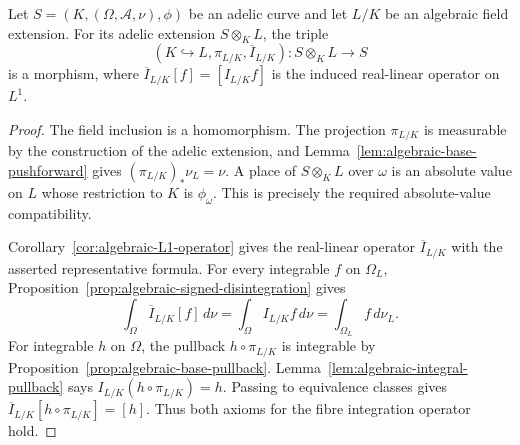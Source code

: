 \begin{example}
\label{ex:algebraic-extension-morphism}
\leanok
{}
Let $S=(K,(\Omega,\mathcal A,\nu),\phi)$ be an adelic curve and
let $L/K$ be an algebraic field extension. For its adelic extension
$S\otimes_K L$, the triple
\[
 (K\hookrightarrow L,\pi_{L/K},\overline I_{L/K})
 :S\otimes_K L\longrightarrow S
\]
is a morphism, where
$\overline I_{L/K}[f]=[I_{L/K}f]$ is the induced real-linear
operator on $L^1$.
\end{example}
\begin{proof}
The field inclusion is a homomorphism. The projection $\pi_{L/K}$
is measurable by the construction of the adelic extension, and
Lemma~\ref{lem:algebraic-base-pushforward} gives
$(\pi_{L/K})_*\nu_L=\nu$. A place of $S\otimes_K L$ over
$\omega$ is an absolute value on $L$ whose restriction to $K$ is
$\phi_\omega$. This is precisely the required absolute-value
compatibility.

Corollary~\ref{cor:algebraic-L1-operator} gives the real-linear
operator $\overline I_{L/K}$ with the asserted representative formula.
For every integrable $f$ on $\Omega_L$,
Proposition~\ref{prop:algebraic-signed-disintegration} gives
\[
 \int_\Omega\overline I_{L/K}[f]\,d\nu
 =\int_\Omega I_{L/K}f\,d\nu
 =\int_{\Omega_L}f\,d\nu_L.
\]
For integrable $h$ on $\Omega$, the pullback $h\circ\pi_{L/K}$
is integrable by Proposition~\ref{prop:algebraic-base-pullback}.
Lemma~\ref{lem:algebraic-integral-pullback} says
$I_{L/K}(h\circ\pi_{L/K})=h$. Passing to equivalence classes gives
$\overline I_{L/K}[h\circ\pi_{L/K}]=[h]$.
Thus both axioms for the fibre integration operator hold.
\end{proof}

